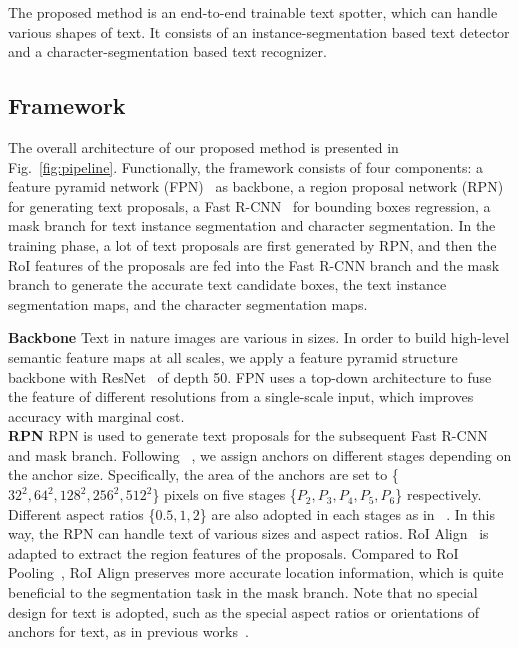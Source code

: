 \documentclass[runningheads]{llncs}
\begin{document}
The proposed method is an end-to-end trainable text spotter, which can handle various shapes of text. It consists of an instance-segmentation based text detector and a character-segmentation based text recognizer.
\subsection{Framework}\label{sec:framework}

The overall architecture of our proposed method is presented in Fig.~\ref{fig:pipeline}. Functionally, the framework consists of four components: a feature pyramid network (FPN)~\cite{lin2017feature} as backbone, a region proposal network (RPN)~\cite{ren2015faster} for generating text proposals, a Fast R-CNN~\cite{ren2015faster} for bounding boxes regression, a mask branch for text instance segmentation and character segmentation. 
In the training phase, a lot of text proposals are first generated by RPN, and then the RoI features of the proposals are fed into the Fast R-CNN branch and the mask branch to generate the accurate text candidate boxes, the text instance segmentation maps, and the character segmentation maps.

\noindent\textbf{Backbone} Text in nature images are various in sizes. In order to build high-level semantic feature maps at all scales, we apply a feature pyramid structure~\cite{lin2017feature} backbone with ResNet~\cite{resnet} of depth 50.
FPN uses a top-down architecture to fuse the feature of different resolutions from a single-scale input,  which improves accuracy with marginal cost.
\\
\textbf{RPN}
RPN is used to generate text proposals for the subsequent Fast R-CNN and mask branch. Following ~\cite{lin2017feature}, we assign anchors on different stages depending on the anchor size. Specifically, the area of the anchors are set to \{$32^2, 64^2, 128^2, 256^2, 512^2$\} pixels on five stages \{$P_2, P_3, P_4, P_5, P_6$\} respectively. Different aspect ratios \{$0.5,1,2$\} are also adopted in each stages as in ~\cite{ren2015faster}. In this way, the RPN can handle text of various sizes and aspect ratios. RoI Align~\cite{he2017mask} is adapted to extract the region features of the proposals. Compared to RoI Pooling~\cite{fastrcnn}, RoI Align preserves more accurate location information, which is quite beneficial to the segmentation task in the mask branch. Note that no special design for text is adopted, such as the special aspect ratios or orientations of anchors for text, as in previous works~\cite{liao2017textboxes,he2017single,liu2017deep}.
\end{document}
